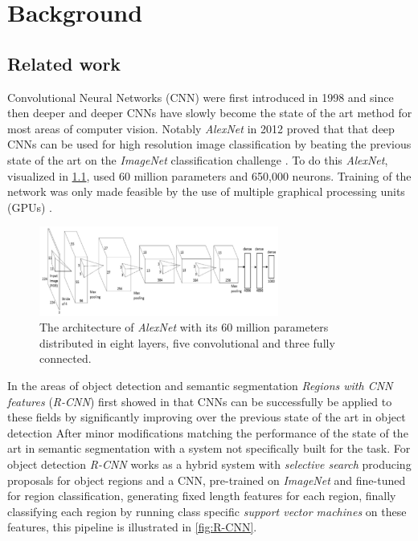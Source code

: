 \documentclass{kththesis}
\newcommand{\bibentry}[1]{\parencite{#1}}
\begin{document}
\chapter{Background}
\section{Related work}
Convolutional Neural Networks (CNN) were first introduced in 1998
\bibentry{lecun1998gradient} and since then deeper and deeper CNNs have slowly
become the state of the art method for most areas of computer vision. Notably
\emph{AlexNet} \bibentry{krizhevsky2012imagenet} in 2012 proved that that deep
CNNs can be used for high resolution image classification by beating the
previous state of the art \bibentry{sanchez2011high} on the \emph{ImageNet}
classification challenge \bibentry{deng2009imagenet}. To do this \emph{AlexNet},
visualized in \cref{fig:AlexNet}, 
used 60 million parameters and 650,000 neurons. Training of the network was
only made feasible by the use of multiple graphical processing units (GPUs)
\bibentry{krizhevsky2012imagenet}.

\begin{figure}[h]
  \centering
  \includegraphics[width=0.7\textwidth]{AlexNet}
  \caption{The architecture of \textit{AlexNet} with its 60 million parameters
    distributed
    in eight layers, five convolutional and three fully connected.}
  \label{fig:AlexNet}
  \end{figure}

In the areas of object detection and semantic segmentation \emph{Regions
  with CNN features} (\emph{R-CNN}) \bibentry{girshick2014rich} 
first showed in that CNNs can be successfully be applied to these fields by
significantly improving over the previous state of the art in object detection
\bibentry{ren2013histograms} After minor modifications matching the
performance of the state of the art in semantic segmentation
\bibentry{carreira2012semantic} with a system not specifically built for the
task. For object detection \emph{R-CNN} works as a hybrid system with
\emph{selective search} \bibentry{uijlings2013selective} producing proposals for
object regions and a CNN, pre-trained on \emph{ImageNet}
\bibentry{deng2009imagenet} and fine-tuned for region classification, generating
fixed length features for each region, finally classifying each region by
running class specific \emph{support vector machines}
\bibentry{boser1992training} on these features, this pipeline is illustrated in \cref{fig:R-CNN}.
\end{document}
